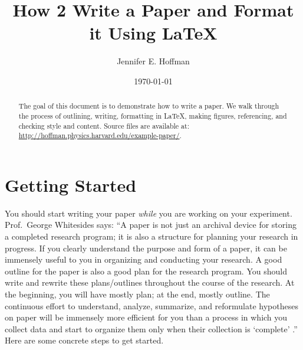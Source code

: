 \documentclass[aps,prb,twocolumn,superscriptaddress,floatfix,longbibliography]{revtex4-2}
\newif\ifptitle
\newif\ifpnumber
\newcounter{para}
\newcommand\ptitle[1]{\par\refstepcounter{para}
{\ifpnumber{\noindent\textcolor{lightgray}{\textbf{\thepara}}\indent}\fi}
{\ifptitle{\textbf{[{#1}]}}\fi}}
\newcommand{\mytitle}{How 2 Write a Paper and Format it Using \LaTeX}
\begin{document}
\title{\mytitle}

\author{Jennifer E. Hoffman}

\date{\today}

\begin{abstract}
The goal of this document is to demonstrate how to write a paper. We walk through the process of outlining, writing, formatting in \LaTeX, making figures, referencing, and checking style and content. Source files are available at: \url{http://hoffman.physics.harvard.edu/example-paper/}.
\end{abstract}

\maketitle
\section{\label{sec:Start}Getting Started}

\ptitle{Start writing while you experiment} You should start writing your paper \textit{while} you are working on your experiment. Prof.\ George Whitesides says: ``A paper is not just an archival device for storing a completed research program; it is also a structure for planning your research in progress. If you clearly understand the purpose and form of a paper, it can be immensely useful to you in organizing and conducting your research. A good outline for the paper is also a good plan for the research program. You should write and rewrite these plans/outlines throughout the course of the research. At the beginning, you will have mostly plan; at the end, mostly outline. The continuous effort to understand, analyze, summarize, and reformulate hypotheses on paper will be immensely more efficient for you than a process in which you collect data and start to organize them only when their collection is `complete' .'' Here are some concrete steps to get started.
\end{document}
